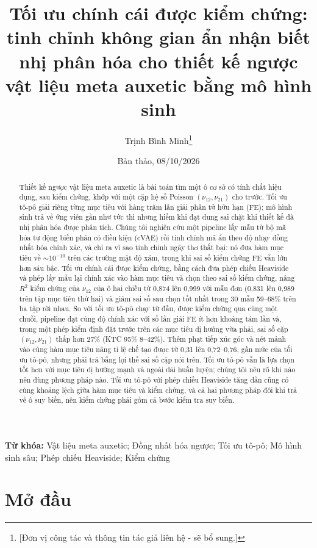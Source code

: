 \documentclass[a4paper,11pt]{article}
\title{Tối ưu chính cái được kiểm chứng: tinh chỉnh không gian ẩn nhận biết
nhị phân hóa cho thiết kế ngược vật liệu meta auxetic bằng mô hình sinh}
\author{Trịnh Bình Minh\thanks{[Đơn vị công tác và thông tin tác giả liên hệ - sẽ bổ sung.]}}
\date{Bản thảo, 08/10/2026}
\newcommand{\nuot}{\nu_{12}}
\newcommand{\nuto}{\nu_{21}}
\newcommand{\RR}{R^2}
\begin{document}
\maketitle

\begin{abstract}
Thiết kế ngược vật liệu meta auxetic là bài toán tìm một ô cơ sở có tính chất
hiệu dụng, sau kiểm chứng, khớp với một cặp hệ số Poisson $(\nuot,\nuto)$ cho
trước. Tối ưu tô-pô giải riêng từng mục tiêu với hàng trăm lần giải phần tử
hữu hạn (FE); mô hình sinh trả về ứng viên gần như tức thì nhưng hiếm khi đạt
dung sai chặt khi thiết kế đã nhị phân hóa được phân tích. Chúng tôi nghiên
cứu một pipeline lấy mẫu từ bộ mã hóa tự động biến phân có điều kiện (cVAE)
rồi tinh chỉnh mã ẩn theo độ nhạy đồng nhất hóa chính xác, và chỉ ra vì sao
tinh chỉnh ngây thơ thất bại: nó đưa hàm mục tiêu về $\sim\!10^{-10}$ trên
các trường mật độ xám, trong khi sai số kiểm chứng FE vẫn lớn hơn sáu bậc.
Tối ưu chính cái được kiểm chứng, bằng cách đưa phép chiếu Heaviside và phép
lấy mẫu lại chính xác vào hàm mục tiêu và chọn theo sai số kiểm chứng, nâng
$\RR$ kiểm chứng của $\nuot$ của ô hai chiều từ 0,874 lên 0,999 với mẫu đơn
(0,831 lên 0,989 trên tập mục tiêu thứ hai) và giảm sai số sau chọn tốt nhất
trong 30 mẫu 59--68\% trên ba tập rời nhau. So với tối ưu tô-pô chạy từ đầu,
được kiểm chứng qua cùng một chuỗi, pipeline đạt cùng độ chính xác với số lần
giải FE ít hơn khoảng tám lần và, trong một phép kiểm định đặt trước trên các
mục tiêu dị hướng vừa phải, sai số cặp $(\nuot,\nuto)$ thấp hơn 27\% (KTC
95\% 8--42\%). Thêm phạt tiếp xúc góc và nét mảnh vào cùng hàm mục tiêu nâng
tỉ lệ chế tạo được từ 0,31 lên 0,72--0,76, gần mức của tối ưu tô-pô, nhưng
phải trả bằng lợi thế sai số cặp nói trên. Tối ưu tô-pô vẫn là lựa chọn tốt
hơn với mục tiêu dị hướng mạnh và ngoài dải huấn luyện; chúng tôi nêu rõ khi
nào nên dùng phương pháp nào. Tối ưu tô-pô với phép chiếu Heaviside tăng dần cũng
có cùng khoảng lệch giữa hàm mục tiêu và kiểm chứng, và cả hai phương pháp
đôi khi trả về ô suy biến, nên kiểm chứng phải gồm cả bước kiểm tra suy biến.
\end{abstract}

\noindent\textbf{Từ khóa:} Vật liệu meta auxetic; Đồng nhất hóa ngược; Tối
ưu tô-pô; Mô hình sinh sâu; Phép chiếu Heaviside; Kiểm chứng

\section{Mở đầu}
\end{document}
